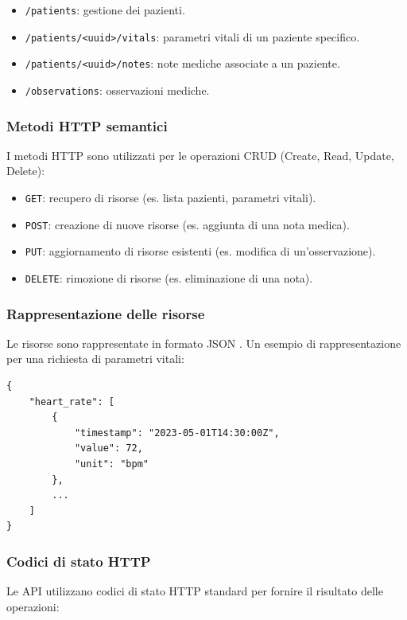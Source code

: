 \documentclass[12pt,a4paper,oneside]{report}
\begin{document}
\begin{itemize}
    \item \texttt{/patients}: gestione dei pazienti.
    \item \texttt{/patients/<uuid>/vitals}: parametri vitali di un paziente specifico.
    \item \texttt{/patients/<uuid>/notes}: note mediche associate a un paziente.
    \item \texttt{/observations}: osservazioni mediche.
\end{itemize}

\subsubsection{Metodi HTTP semantici}
I metodi HTTP sono utilizzati per le operazioni CRUD (Create, Read, Update, Delete):

\begin{itemize}
    \item \texttt{GET}: recupero di risorse (es. lista pazienti, parametri vitali).
    \item \texttt{POST}: creazione di nuove risorse (es. aggiunta di una nota medica).
    \item \texttt{PUT}: aggiornamento di risorse esistenti (es. modifica di un'osservazione).
    \item \texttt{DELETE}: rimozione di risorse (es. eliminazione di una nota).
\end{itemize}

\subsubsection{Rappresentazione delle risorse}
Le risorse sono rappresentate in formato JSON \cite{json}.
Un esempio di rappresentazione per una richiesta di parametri vitali:

\begin{verbatim}
{
    "heart_rate": [
        {
            "timestamp": "2023-05-01T14:30:00Z",
            "value": 72,
            "unit": "bpm"
        },
        ...
    ]
}
\end{verbatim}

\subsubsection{Codici di stato HTTP}
Le API utilizzano codici di stato HTTP standard per fornire il risultato delle operazioni:
\end{document}

